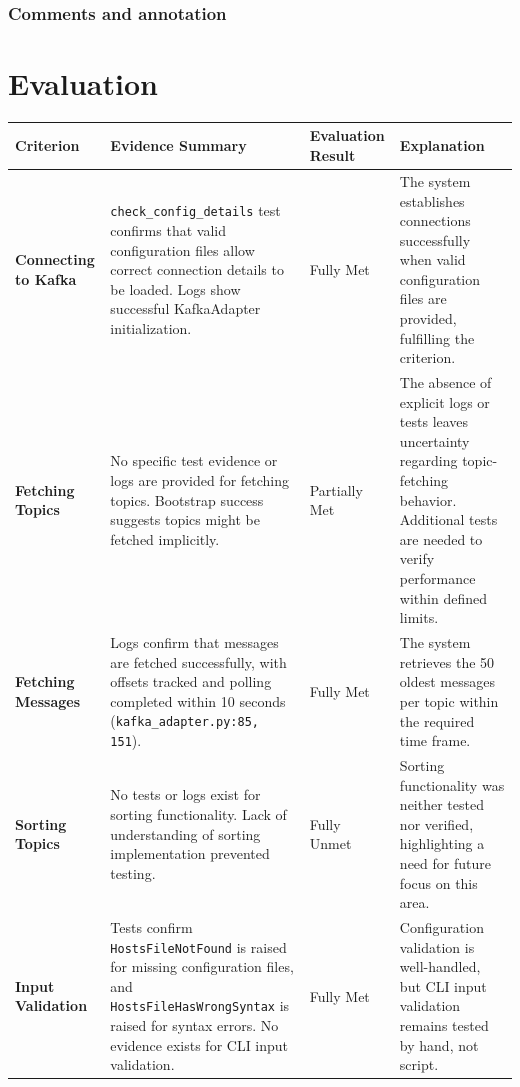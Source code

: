 \documentclass[10pt , a4paper]{report}
\begin{document}
\subsection{Comments and annotation}

\newpage
\chapter{Evaluation}

\begin{table}[h!tbp]
\centering
\renewcommand{\arraystretch}{1.3}
\begin{adjustbox}{max width=\textwidth}
\begin{tabular}{|p{3.5cm}|p{5.5cm}|p{3.5cm}|p{3.5cm}|}
\hline
\textbf{Criterion} & \textbf{Evidence Summary} & \textbf{Evaluation Result} & \textbf{Explanation} \\ \hline

\textbf{Connecting to Kafka} & 
\texttt{check\_config\_details} test  confirms that valid configuration files allow correct connection details to be loaded. Logs show successful KafkaAdapter initialization. & 
Fully Met & 
The system establishes connections successfully when valid configuration files are provided, fulfilling the criterion. \\ \hline

\textbf{Fetching Topics} & 
No specific test evidence or logs are provided for fetching topics. Bootstrap success suggests topics might be fetched implicitly. & 
Partially Met & 
The absence of explicit logs or tests leaves uncertainty regarding topic-fetching behavior. Additional tests are needed to verify performance within defined limits. \\ \hline

\textbf{Fetching Messages} & 
Logs confirm that messages are fetched successfully, with offsets tracked and polling completed within 10 seconds (\texttt{kafka\_adapter.py:85, 151}). & 
Fully Met & 
The system retrieves the 50 oldest messages per topic within the required time frame. \\ \hline

\textbf{Sorting Topics} & 
No tests or logs exist for sorting functionality. Lack of understanding of sorting implementation prevented testing. & 
Fully Unmet & 
Sorting functionality was neither tested nor verified, highlighting a need for future focus on this area. \\ \hline

\textbf{Input Validation} & 
Tests confirm \texttt{HostsFileNotFound} is raised for missing configuration files, and \texttt{HostsFileHasWrongSyntax} is raised for syntax errors. No evidence exists for CLI input validation. & 
Fully Met & 
Configuration validation is well-handled, but CLI input validation remains tested by hand, not script. \\ \hline


\end{tabular}
\end{adjustbox}
\end{table}
\end{document}
